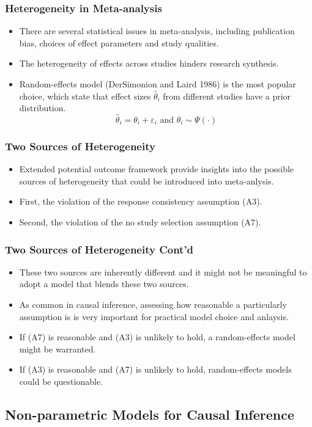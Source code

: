 \documentclass[xetex,mathserif,serif]{beamer}
\begin{document}
\begin{frame}
  \frametitle{Heterogeneity in Meta-analysis}
  \begin{itemize}
  \item There are several statistical issues in meta-analysis, including
    publication bias, choices of effect parameters and study qualities.
  \item The heterogeneity of effects across studies hinders research synthesis.
  \item Random-effects model (DerSimonion and Laird 1986) is the most popular
    choice, which state that effect sizes $\hat\theta_i$ from different studies
    have a prior distribution.
    \[\hat\theta_i=\theta_i+\varepsilon_i\text{  and  }\theta_i\sim \Psi(\cdot)\]
  \end{itemize}
\end{frame}

\begin{frame}
  \frametitle{Two Sources of Heterogeneity}
  \begin{itemize}
  \item Extended potential outcome framework provide insights into the possible
    sources of heterogeneity that could be introduced into meta-anlysis.
  \item First, the violation of the response consistency assumption (A3).
  \item Second, the violation of the no study selection assumption (A7).
  \end{itemize}
\end{frame}

\begin{frame}
  \frametitle{Two Sources of Heterogeneity Cont'd}
  \begin{itemize}
  \item These two sources are inherently different and it might not be meaningful
    to adopt a model that blends these two sources. 
  \item As common in causal inference, assessing how reasonable a particularly
    assumption is is very important for practical model choice and anlaysis.
  \item If (A7) is reasonable and (A3) is unlikely to hold, a random-effects
    model might be warranted.
  \item  If (A3) is reasonable and (A7) is unlikely to hold, random-effects
    models could be questionable.
  \end{itemize}
\end{frame}
\subsection{Non-parametric Models for Causal Inference}
\end{document}
